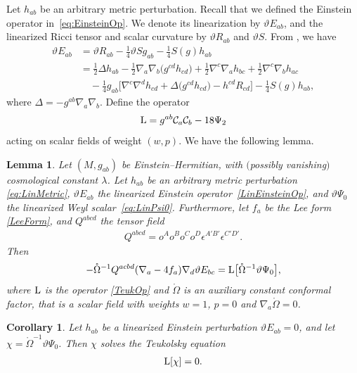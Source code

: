 \documentclass[pdftex]{sigma}
\numberwithin{equation}{section}
\newtheorem{Corollary}[Theorem]{Corollary}
\newtheorem{Lemma}[Theorem]{Lemma}
\begin{document}
Let $h_{ab}$ be an arbitrary metric perturbation. Recall that we defined the Einstein operator in~\eqref{eq:EinsteinOp}. We denote its linearization by $\vartheta{E}_{ab}$, and the linearized Ricci tensor and scalar curvature by $\vartheta R_{ab}$ and $\vartheta S$. From \cite[Theorem~1.174]{MR2371700}, we have
\begin{align}
\vartheta E_{ab} &{}= \vartheta R_{ab} - \frac{1}{4}\vartheta S g_{ab} - \frac{1}{4}S(g)h_{ab} \nonumber\\
&{}= \frac{1}{2}\Delta h_{ab} - \frac{1}{2}\nabla_{a}\nabla_{b}\bigl(g^{cd}h_{cd}\bigr) + \frac{1}{2}\nabla^{c}\nabla_{a}h_{bc} + \frac{1}{2}\nabla^{c} \nabla_{b}h_{ac} \nonumber\\
&\quad{} - \frac{1}{4}g_{ab}\bigl[ \nabla^{c}\nabla^{d}h_{cd} + \Delta\bigl(g^{cd}h_{cd}\bigr) - h^{cd}R_{cd} \bigr]
-\frac{1}{4}S(g) h_{ab},\label{LinEinsteinOp}
\end{align}
where $\Delta=-g^{ab}\nabla_{a}\nabla_{b}$. Define the operator
\begin{align}\label{TeukOp}
 {\rm L}=g^{ab}\mathcal{C}_{a}\mathcal{C}_{b}-18\Psi_{2}
\end{align}
acting on scalar fields of weight $(w,p)$. We have the following lemma.
\begin{Lemma}\label{lem:OpId}
Let $(M,g_{ab})$ be Einstein--Hermitian, with $($possibly vanishing$)$ cosmological constant $\lambda$. Let $h_{ab}$ be an arbitrary metric perturbation \eqref{eq:LinMetric}, $\vartheta{E}_{ab}$ the linearized Einstein operator~\eqref{LinEinsteinOp}, and $\vartheta\Psi_0$ the linearized Weyl scalar~\eqref{eq:LinPsi0}. Furthermore, let $f_{a}$ be the Lee form \eqref{LeeForm}, and $Q^{abcd}$ the tensor field
\begin{align}\label{tensorQ}
Q^{abcd} = o^{A}o^{B}o^{C}o^{D}\epsilon^{A'B'}\epsilon^{C'D'}.
\end{align}
Then
\begin{align}\label{eq:OpIdentity}
-\mathring{\Omega}^{-1}Q^{acbd}(\nabla_{a}-4f_{a})\nabla_{d}\vartheta E_{bc} = {\rm L}\bigl[\mathring{\Omega}^{-1}\vartheta\Psi_0\bigr],
\end{align}
where ${\rm L}$ is the operator \eqref{TeukOp} and $\mathring{\Omega}$ is an auxiliary constant conformal factor, that is a scalar field with weights $w=1$, $p=0$ and $\nabla_{a}\mathring\Omega=0$.
\end{Lemma}

\begin{Corollary}\label{item:teuk}
Let $h_{ab}$ be a linearized Einstein perturbation $\vartheta E_{ab}=0$, and let $\chi=\mathring{\Omega}^{-1}\vartheta\Psi_0$. Then $\chi$ solves the Teukolsky equation
\begin{align} \label{TeukEq}
{\rm L}[\chi] = 0.
\end{align}
\end{Corollary}
\end{document}
